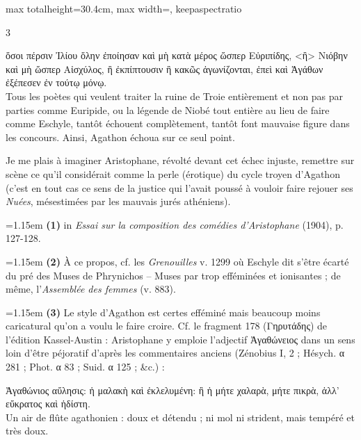\documentclass[11pt,twoside]{book}
\newcommand{\italique}[1]{\textit{#1}}
\newcommand{\citComm}[1]{\begin{quoting}[vskip=0.4pt,leftmargin=0.7em,rightmargin=0.2em]#1\end{quoting}}
\newcommand{\francais}[1]{{\policeFr #1}}
\begin{document}
\begin{adjustbox}{max totalheight=30.4cm, max width=\textwidth, keepaspectratio}
\begin{minipage}{\textwidth}
{\begin{multicols}{3}
\citComm{ὅσοι πέρσιν Ἰλίου ὅλην ἐποίησαν καὶ μὴ κατὰ μέρος ὥσπερ Εὐριπίδης, <ἢ> Νιόβην καὶ μὴ ὥσπερ Αἰσχύλος, ἢ ἐκπίπτουσιν ἢ κακῶς ἀγωνίζονται, ἐπεὶ καὶ Ἀγάθων ἐξέπεσεν ἐν τούτῳ μόνῳ.\\
\francais{Tous les poètes qui veulent traiter la ruine de Troie entièrement et non pas par parties comme Euripide, ou la légende de Niobé tout entière au lieu de faire comme Eschyle, tantôt échouent complètement, tantôt font mauvaise figure dans les concours. Ainsi, Agathon échoua sur ce seul point.}}
\par\vspace{1.5pt}
\noindent Je me plais à imaginer Aristophane, révolté devant cet échec injuste, remettre sur scène ce qu'il considérait comme la perle (érotique) du cycle troyen d'Agathon (c'est en tout cas ce sens de la justice qui l'avait poussé à vouloir faire rejouer ses \italique{Nuées}, mésestimées par les mauvais jurés athéniens).
\par\vspace{1.5pt}
\par\vspace{1.2pt}\par\nopagebreak\vspace{1pt}\noindent\hangindent=1.15em {\color{sepiaNote}\textbf{(1)}} in \italique{Essai sur la composition des comédies d'Aristophane} (1904), p. 127-128.
\par\vspace{1.5pt}
\noindent\hangindent=1.15em {\color{sepiaNote}\textbf{(2)}} À ce propos, cf. les \italique{Grenouilles} v. 1299 où Eschyle dit s'être écarté du pré des Muses de Phrynichos – Muses par trop efféminées et ionisantes ; de même, l'\italique{Assemblée des femmes} (v. 883).
\par\vspace{1.5pt}
\noindent\hangindent=1.15em {\color{sepiaNote}\textbf{(3)}} Le style d'Agathon est certes efféminé mais beaucoup moins caricatural qu'on a voulu le faire croire. Cf. le fragment 178 (Γηρυτάδης) de l'édition Kassel-Austin : Aristophane y emploie l'adjectif Ἀγαθώνειος dans un sens loin d'être péjoratif d'après les commentaires anciens (Zénobius I, 2 ; Hésych. α 281 ; Phot. α 83 ; Suid. α 125 ; \&c.) :
\citComm{Ἀγαθώνιος αὔλησις: ἡ μαλακὴ καὶ ἐκλελυμένη: ἢ ἡ μήτε χαλαρὰ, μήτε πικρὰ, ἀλλ' εὔκρατος καὶ ἡδίστη.\\
Un air de flûte agathonien : doux et détendu ; ni mol ni strident, mais tempéré et très doux.}

\end{multicols}}
\end{minipage}
\end{adjustbox}
\end{document}
